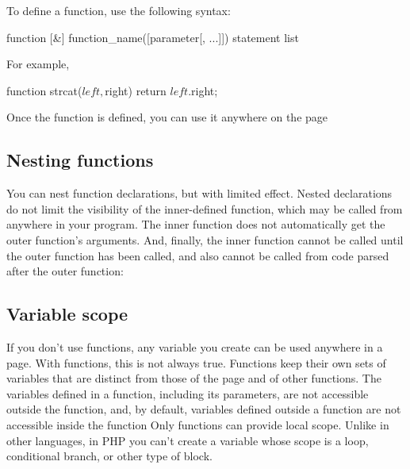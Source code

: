 \documentclass{report}
\begin{document}
\pagebreak 
{}
\bigbreak \noindent 
To define a function, use the following syntax:
\begin{phpcode}
    function [&] function_name([parameter[, ...]])
    {
        statement list
    }
\end{phpcode}
\bigbreak \noindent 
For example, 
\bigbreak \noindent 
\begin{phpcode}
    function strcat($left, $right)
    {
        return $left . $right;
    }
\end{phpcode}
\bigbreak \noindent 
Once the function is defined, you can use it anywhere on the page
\bigbreak \noindent 
\subsection{Nesting functions}
\bigbreak \noindent 
You can nest function declarations, but with limited effect. Nested declarations do not
limit the visibility of the inner-defined function, which may be called from anywhere
in your program. The inner function does not automatically get the outer function’s
arguments. And, finally, the inner function cannot be called until the outer function
has been called, and also cannot be called from code parsed after the outer function:
\bigbreak \noindent 
{}

\bigbreak \noindent 
\subsection{Variable scope}
\bigbreak \noindent 
If you don’t use functions, any variable you create can be used anywhere in a page.
With functions, this is not always true. Functions keep their own sets of variables that
are distinct from those of the page and of other functions.
\bigbreak \noindent 
The variables defined in a function, including its parameters, are not accessible outside
the function, and, by default, variables defined outside a function are not accessible
inside the function
\bigbreak \noindent 
Only functions can provide local scope. Unlike in other languages, in PHP you can’t
create a variable whose scope is a loop, conditional branch, or other type of block.

\bigbreak \noindent 
\end{document}

